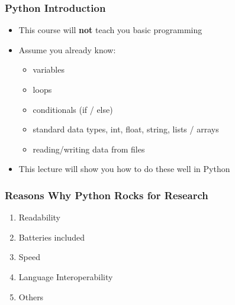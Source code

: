 \documentclass[t,10pt,compress=false,usepdftitle=false]{beamer}
\begin{document}
\begin{frame}[fragile]
    \frametitle{Python Introduction}
    \begin{itemize}
        \item This course will \textbf{not} teach you basic programming
        \pause
        \item Assume you already know:
        \begin{itemize}
            \item variables
            \item loops
            \item conditionals (if / else)
            \item standard data types, int, float, string, lists / arrays
            \item reading/writing data from files
        \end{itemize}
        \pause
        \item This lecture will show you how to do these well in Python
    \end{itemize}
\end{frame}

\begin{frame}[fragile]
    \frametitle{Reasons Why Python Rocks for Research}
    \begin{enumerate}
        \item Readability
        \item Batteries included
        \item Speed
        \item Language Interoperability
        \item Others
    \end{enumerate}
\end{frame}
\end{document}
